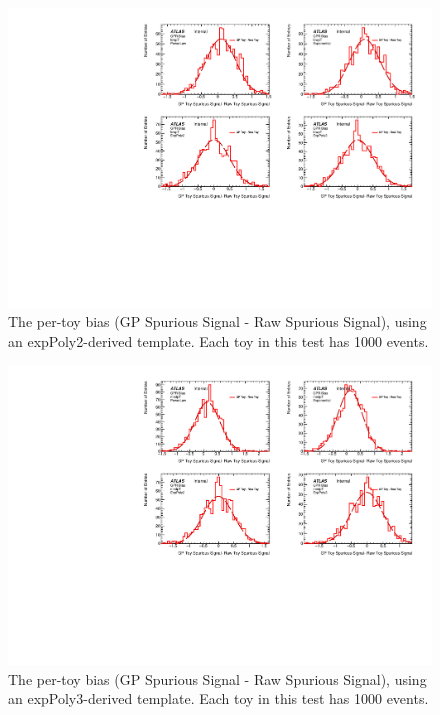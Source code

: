 \begin{figure} 
\begin{center}
  \includegraphics[width=\textwidth]{figures/background/gpr/validation/nominal/ToyTest_FitSigBiases_lowpT_1000_noSig}   
\caption{The per-toy bias (GP Spurious Signal - Raw Spurious Signal), using an expPoly2-derived template. Each toy in this test has 1000 events.}
\label{fig:bias_lowpt_1000_noSig}
\end{center}
\end{figure}

\begin{figure} 
\begin{center}
  \includegraphics[width=\textwidth]{figures/background/gpr/validation/nominal/ToyTest_FitSigBiases_medpT_1000_noSig}   
\caption{The per-toy bias (GP Spurious Signal - Raw Spurious Signal), using an expPoly3-derived template. Each toy in this test has 1000 events.}
\label{fig:bias_medpt_1000_noSig}
\end{center}
\end{figure}

